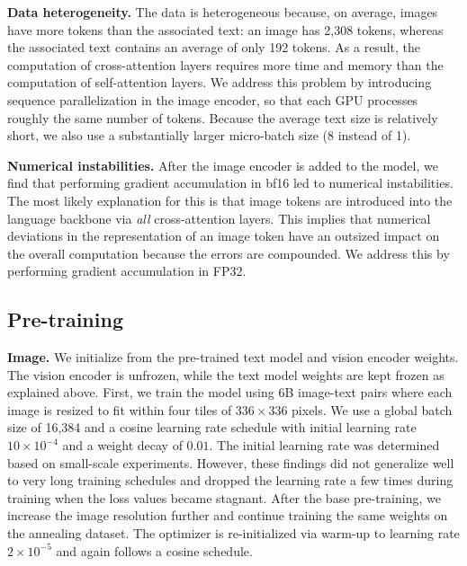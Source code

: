 \documentclass[dvipsnames]{fairmeta}
\begin{document}
\textbf{Data heterogeneity.} The data is heterogeneous because, on average, images have more tokens than the associated text: an image has 2,308 tokens, whereas the associated text contains an average of only 192 tokens.
As a result, the computation of cross-attention layers requires more time and memory than the computation of self-attention layers.
We address this problem by introducing sequence parallelization in the image encoder, so that each GPU processes roughly the same number of tokens.
Because the average text size is relatively short, we also use a substantially larger micro-batch size (8 instead of 1).

\textbf{Numerical instabilities.} After the image encoder is added to the model, we find that performing gradient accumulation in bf16 led to numerical instabilities.
The most likely explanation for this is that image tokens are introduced into the language backbone via \emph{all} cross-attention layers.
This implies that numerical deviations in the representation of an image token have an outsized impact on the overall computation because the errors are compounded.
We address this by performing gradient accumulation in FP32.

\subsection{Pre-training}
\label{section:vision_training_recipe}

\textbf{Image.}
We initialize from the pre-trained text model and vision encoder weights.
The vision encoder is unfrozen, while the text model weights are kept frozen as explained above.
First, we train the model using 6B image-text pairs where each image is resized to fit within four tiles of $336 \times 336$ pixels.
We use a global batch size of 16,384 and a cosine learning rate schedule with initial learning rate $10 \times 10^{-4}$ and a weight decay of $0.01$.
The initial learning rate was determined based on small-scale experiments.
However,  these findings did not generalize well to very long training schedules and dropped the learning rate a few times during training when the loss values became stagnant.
After the base pre-training, we increase the image resolution further and continue training the same weights on the annealing dataset.
The optimizer is re-initialized via warm-up to learning rate $2 \times 10^{-5}$ and again follows a cosine schedule.
\end{document}
